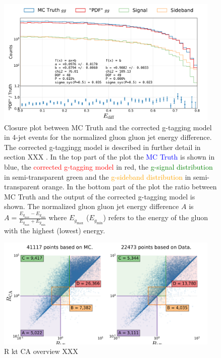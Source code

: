 \begin{figure}
  \centerfloat
  \includegraphics[width=0.95\textwidth, trim=0 0 0 65, clip, page=1]{figures/quarks/gtag-closure_test-down_sample=1.00-ML_vars=vertex-selection=b-ejet_min=4-n_iter_RS_lgb=99-n_iter_RS_xgb=9-cdot_cut=0.90-version=19-njet=3.pdf}
  \caption[Closure plot between MC Truth and the corrected g-tagging model in 4-jet events for the normalized gluon gluon jet energy difference]
          {Closure plot between MC Truth and the corrected g-tagging model in 4-jet events for the normalized gluon gluon jet energy difference. The corrected g-taggingg model is described in further detail in section XXX \TODO. In the top part of the plot the \textcolor{blue}{MC Truth} is shown in blue, the \textcolor{red}{corrected g-tagging model}  in red, the \textcolor{green}{g-signal distribution} in semi-transparent green and the \textcolor{orange}{g-sideband distribution} in semi-transparent orange. In the bottom part of the plot the ratio between MC Truth and the output of the corrected g-tagging model is shown. The normalized gluon gluon jet energy difference $A$ is $A=\frac{E_{g_\mathrm{max}}-E_{g_\mathrm{min}}}{E_{g_\mathrm{max}}+E_{g_\mathrm{min}}}$ where $E_{g_\mathrm{max}}$ ($E_{g_\mathrm{min}}$) refers to the energy of the gluon with the highest (lowest) energy.
          } 
  \label{fig:q:closure_E_diff}
\end{figure}


\begin{figure}
  \centerfloat
  \includegraphics[width=0.95\textwidth, trim=0 0 0 118, clip, page=1]{figures/quarks/gtag-R_kt_CA_overview-down_sample=1.00-ML_vars=vertex-selection=b-ejet_min=4-n_iter_RS_lgb=99-n_iter_RS_xgb=9-cdot_cut=0.90-version=19-njet=4}
  \caption[R kt CA overview  XXX \TODO]
          {R kt CA overview XXX \TODO
          } 
  \label{fig:q:R_kt_CA_overview}
\end{figure}

